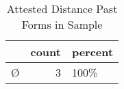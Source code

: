 \begin{table}[htbp!]
\centering
\caption{Attested Distance Past Forms in Sample}
\label{table:distpast_front}
\begin{tabular}{lrl}
\toprule
{} &  count & percent \\
\midrule
\texthebrew{Ø} &      3 &    100\% \\
\bottomrule
\end{tabular}
\end{table}
